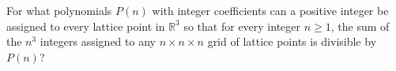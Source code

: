 For what polynomials $P(n)$ with integer coefficients can a positive integer be assigned to every lattice point in $\mathbb{R}^3$ so that for every integer $n \ge 1$, the sum of the $n^3$ integers assigned to any $n \times n \times n$ grid of lattice points is divisible by $P(n)$?